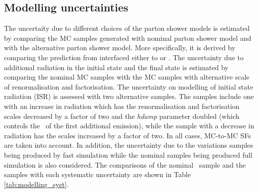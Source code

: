 \subsection{Modelling uncertainties} 
The uncertaity due to different choices of the parton shower models is estimated by comparing
the MC samples generated with nominal parton shower model and with the 
alternative parton shower model.
More specifically, it is derived 
by comparing the prediction from \powheg interfaced either to \pythia or \Herwigpp. 
The uncertainty due to additional radiation in 
the initial state and the final state is estimated by comparing the nominal MC samples with the MC samples 
with alternative scale of renormalisation and factorisation.
The uncertainty on modelling of initial state radiation (ISR) is assessed with two alternative \powhegpythia 
samples. The samples include one with an increase in radiation which has the renormalisation and 
factorisation scales decreased by a factor of two and the \textit{hdamp} parameter doubled 
(which controls the \pt\ of the first additional emission), while 
the sample with a decrease in radiation has the scales increased by a factor of two. 
In all cases, MC-to-MC SFs are taken into account.
In addition, the uncertainty due to the
variations samples being produced by fast simulation while the nominal samples being 
produced full simulation is also considered.
The comparisons of 
the nominal \ttbar\ sample and the samples with each systematic uncertainty 
are shown in Table \ref{tab:modelling_syst}. 



